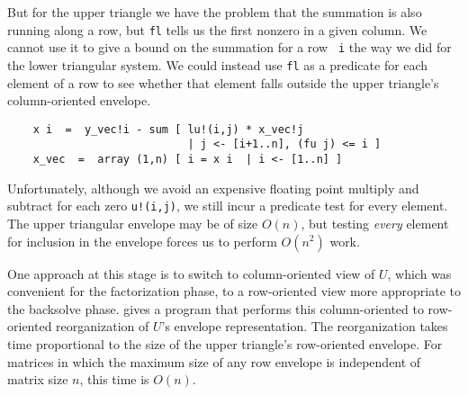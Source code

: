 But for the upper triangle we have the problem that the summation is
also running along a row, but {\tt fl} tells us the first nonzero in a  
given
column.  We cannot use it to give a bound on the summation for a row {\tt  
i}
the way we did for the lower triangular system.  We could instead use
{\tt fl} as a predicate for each element of a row to see whether that  
element
falls outside the upper triangle's column-oriented envelope.
\begin{verbatim}
    x i  =  y_vec!i - sum [ lu!(i,j) * x_vec!j
                            | j <- [i+1..n], (fu j) <= i ]
    x_vec  =  array (1,n) [ i = x i  | i <- [1..n] ]
\end{verbatim}
Unfortunately, although we avoid an expensive floating point multiply and
subtract for each zero {\tt u!(i,j)}, we still incur a predicate test for
every element.  The upper triangular envelope may be of size $O(n)$,
but testing {\em every} element for inclusion in the envelope forces us
to perform $O(n^2)$ work.

One approach at this stage is to switch to column-oriented view of
$U$, which was convenient for the factorization phase, to a
row-oriented view more appropriate to the backsolve phase.
\cite{huda88f} gives a program that performs this column-oriented to
row-oriented reorganization of $U$'s envelope representation.  The
reorganization takes time proportional to the size of the upper
triangle's row-oriented envelope.  For matrices in which the maximum
size of any row envelope is independent of matrix size $n$, this time
is $O(n)$.

